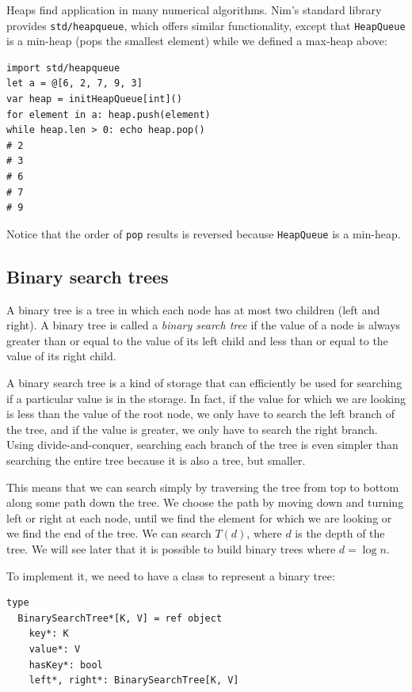\documentclass[justified, sixbynine]{tufte-book}
\def\ft{\small\tt}
\theoremstyle{plain}%
\newtheorem * {corollary}{Corollary}
\theoremstyle{definition}
\theoremstyle{remark}
\newtheorem * {remark}{Remark}
\newtheorem * {note}{Note}
\begin{document}
\begin{fullwidth}
Heaps find application in many numerical algorithms. Nim's standard library provides {\ft std/heapqueue}, which offers similar functionality, except that {\ft HeapQueue} is a min-heap (pops the smallest element) while we defined a max-heap above:

\begin{lstlisting}
import std/heapqueue
let a = @[6, 2, 7, 9, 3]
var heap = initHeapQueue[int]()
for element in a: heap.push(element)
while heap.len > 0: echo heap.pop()
# 2
# 3
# 6
# 7
# 9
\end{lstlisting}

Notice that the order of {\ft pop} results is reversed because {\ft HeapQueue} is a min-heap.

\subsection{Binary search trees}


A binary tree is a tree in which each node has at most two children (left and right). A binary tree is called a {\it binary search tree} if the value of a node is always greater than or equal to the value of its left child and less than or equal to the value of its right child.

A binary search tree is a kind of storage that can efficiently be used for searching if a particular value is in the storage. In fact, if the value for which we are looking is less than the value of the root node, we only have to search the left branch of the tree, and if the value is greater, we only have to search the right branch. Using divide-and-conquer, searching each branch of the tree is even simpler than searching the entire tree because it is also a tree, but smaller.

This means that we can search simply by traversing the tree from top to bottom along some path down the tree. We choose the path by moving down and turning left or right at each node, until we find the element for which we are looking or we find the end of the tree. We can search $T(d)$, where $d$ is the depth of the tree. We will see later that it is possible to build binary trees where $d=\log n$.

To implement it, we need to have a class to represent a binary tree:

\begin{lstlisting}
type
  BinarySearchTree*[K, V] = ref object
    key*: K
    value*: V
    hasKey*: bool
    left*, right*: BinarySearchTree[K, V]


\end{lstlisting}
\end{fullwidth}
\end{document}
